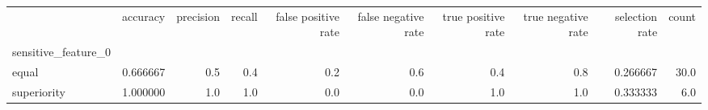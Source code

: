 \begin{tabular}{lrrrrrrrrr}
\toprule
{} &  accuracy &  precision &  recall &  false positive rate &  false negative rate &  true positive rate &  true negative rate &  selection rate &  count \\
sensitive\_feature\_0 &           &            &         &                      &                      &                     &                     &                 &        \\
\midrule
equal               &  0.666667 &        0.5 &     0.4 &                  0.2 &                  0.6 &                 0.4 &                 0.8 &        0.266667 &   30.0 \\
superiority         &  1.000000 &        1.0 &     1.0 &                  0.0 &                  0.0 &                 1.0 &                 1.0 &        0.333333 &    6.0 \\
\bottomrule
\end{tabular}

